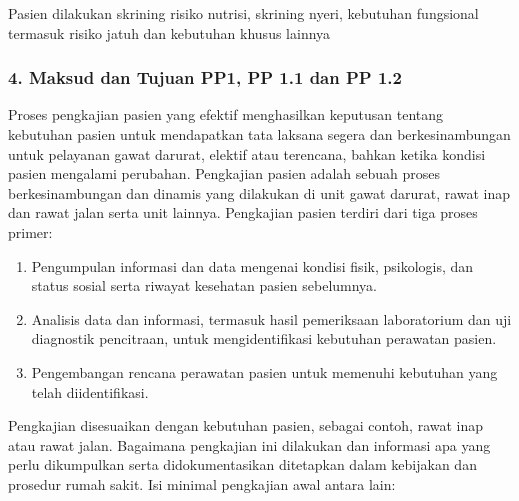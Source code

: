 \documentclass[
]{book}
\providecommand{\tightlist}{%
  \setlength{\itemsep}{0pt}\setlength{\parskip}{0pt}}
\begin{document}
Pasien dilakukan skrining risiko nutrisi, skrining nyeri, kebutuhan fungsional termasuk risiko jatuh dan kebutuhan khusus lainnya

\hypertarget{maksud-dan-tujuan-pp1-pp-1.1-dan-pp-1.2}{%
\subsubsection*{4. Maksud dan Tujuan PP1, PP 1.1 dan PP 1.2}\label{maksud-dan-tujuan-pp1-pp-1.1-dan-pp-1.2}}

Proses pengkajian pasien yang efektif menghasilkan keputusan tentang kebutuhan pasien untuk mendapatkan tata laksana segera dan berkesinambungan untuk pelayanan gawat darurat, elektif atau terencana, bahkan ketika kondisi pasien mengalami perubahan. Pengkajian pasien adalah sebuah proses berkesinambungan dan dinamis yang dilakukan di unit gawat darurat, rawat inap dan rawat jalan serta unit lainnya. Pengkajian pasien terdiri dari tiga proses primer:

\begin{enumerate}
\def\labelenumi{\alph{enumi}.}
\tightlist
\item
  Pengumpulan informasi dan data mengenai kondisi fisik, psikologis, dan status sosial serta riwayat kesehatan pasien sebelumnya.
\item
  Analisis data dan informasi, termasuk hasil pemeriksaan laboratorium dan uji diagnostik pencitraan, untuk mengidentifikasi kebutuhan perawatan pasien.
\item
  Pengembangan rencana perawatan pasien untuk memenuhi kebutuhan yang telah diidentifikasi.
\end{enumerate}

Pengkajian disesuaikan dengan kebutuhan pasien, sebagai contoh, rawat inap atau rawat jalan. Bagaimana pengkajian ini dilakukan dan informasi apa yang perlu dikumpulkan serta didokumentasikan ditetapkan dalam kebijakan dan prosedur rumah sakit.
Isi minimal pengkajian awal antara lain:
\end{document}

